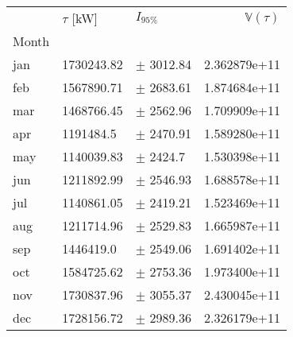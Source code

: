\begin{tabular}{lllr}
\toprule
{} & $\tau$ [kW] &      $I_{95\%}$ &  $\mathbb{V}(\tau)$ \\
Month &             &                 &                     \\
\midrule
jan   &  1730243.82 &   $\pm$ 3012.84 &        2.362879e+11 \\
feb   &  1567890.71 &   $\pm$ 2683.61 &        1.874684e+11 \\
mar   &  1468766.45 &   $\pm$ 2562.96 &        1.709909e+11 \\
apr   &   1191484.5 &   $\pm$ 2470.91 &        1.589280e+11 \\
may   &  1140039.83 &    $\pm$ 2424.7 &        1.530398e+11 \\
jun   &  1211892.99 &   $\pm$ 2546.93 &        1.688578e+11 \\
jul   &  1140861.05 &   $\pm$ 2419.21 &        1.523469e+11 \\
aug   &  1211714.96 &   $\pm$ 2529.83 &        1.665987e+11 \\
sep   &   1446419.0 &   $\pm$ 2549.06 &        1.691402e+11 \\
oct   &  1584725.62 &   $\pm$ 2753.36 &        1.973400e+11 \\
nov   &  1730837.96 &   $\pm$ 3055.37 &        2.430045e+11 \\
dec   &  1728156.72 &   $\pm$ 2989.36 &        2.326179e+11 \\
\bottomrule
\end{tabular}
